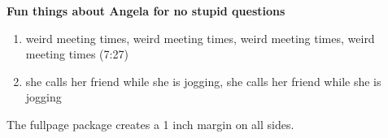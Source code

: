 \documentclass[11pt]{article}
\begin{document}
\textbf{Fun things about Angela for no stupid questions}

\begin{enumerate}
\item weird meeting times, weird meeting times, weird meeting times, weird meeting times (7:27)
\item she calls her friend while she is jogging, she calls her friend while she is jogging
\end{enumerate}

The fullpage package creates a 1 inch margin on all sides.
\end{document}
